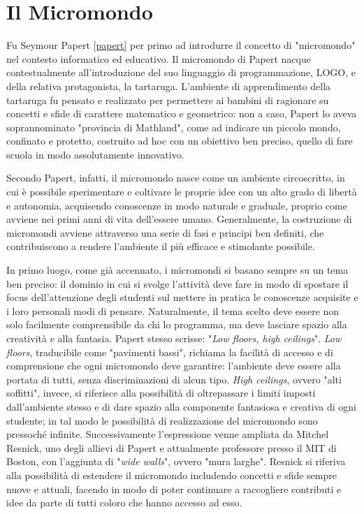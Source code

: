 \section{Il Micromondo}
Fu Seymour Papert \ref{papert} per primo ad introdurre il concetto di "{micromondo}" nel contesto informatico ed educativo.
Il micromondo di Papert nacque contestualmente all'introduzione del suo linguaggio di programmazione, LOGO, e della relativa protagonista, la tartaruga. L'ambiente di apprendimento della tartaruga fu pensato e realizzato per permettere ai bambini di ragionare su concetti e 
sfide di carattere matematico e geometrico: non a caso, Papert lo aveva soprannominato "provincia di Mathland", come ad indicare un piccolo mondo, confinato e protetto, costruito ad hoc con 
un obiettivo ben preciso, quello di fare scuola in modo assolutamente innovativo.

Secondo Papert, infatti, il micromondo nasce come un ambiente circoscritto, in cui è possibile sperimentare e coltivare le proprie idee con un alto grado di libertà e autonomia, acquisendo 
conoscenze in modo naturale e graduale, proprio come avviene nei primi anni di vita dell'essere umano. Generalmente, la costruzione di micromondi avviene attraverso una serie di fasi e 
principi ben definiti, che contribuiscono a rendere l'ambiente il più efficace e stimolante possibile. 

In primo luogo, come già accennato, i micromondi si basano sempre su un tema ben preciso: il dominio in cui si svolge l'attività deve fare in modo di spostare il focus dell'attenzione degli studenti sul mettere in pratica le conoscenze acquisite e i loro personali modi di pensare. 
Naturalmente, il tema scelto deve essere non solo facilmente comprensibile da chi lo programma, ma deve lasciare spazio alla creatività e alla fantasia. Papert stesso scrisse: "\textit{Low floors, high ceilings}".
\textit{Low floors}, traducibile come "pavimenti bassi", richiama la facilità di accesso e di comprensione che ogni micromondo deve garantire: l'ambiente deve essere alla portata di tutti, 
senza discriminazioni di alcun tipo.
\textit{High ceilings}, ovvero "alti soffitti", invece, si riferisce alla possibilità di oltrepassare i limiti imposti dall'ambiente stesso e di dare spazio alla componente fantasiosa e creativa di ogni studente; in tal 
modo le possibilità di realizzazione del micromondo sono pressoché infinite.
Successivamente l'espressione venne ampliata da Mitchel Resnick, uno degli allievi di Papert e attualmente professore presso il MIT di Boston, con l'aggiunta di "\textit{wide walls}", ovvero "mura larghe".
Resnick si riferiva alla possibilità di estendere il micromondo includendo concetti e sfide sempre nuove e attuali, facendo in modo di poter continuare a raccogliere 
contributi e idee da parte di tutti coloro che hanno accesso ad esso.

